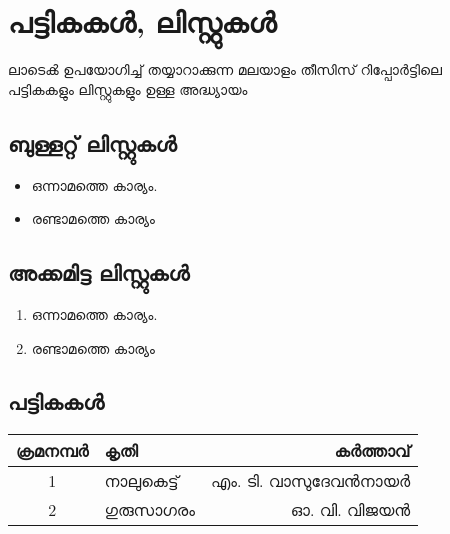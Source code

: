  
\chapter{പട്ടികകൾ, ലിസ്റ്റുകൾ}
ലാടെൿ ഉപയോഗിച്ച് തയ്യാറാക്കുന്ന മലയാളം തീസിസ് റിപ്പോർട്ടിലെ പട്ടികകളും ലിസ്റ്റുകളും ഉള്ള അദ്ധ്യായം

\section{ബുള്ളറ്റ് ലിസ്റ്റുകൾ}

\begin{itemize}
\item ഒന്നാമത്തെ കാര്യം.
\item രണ്ടാമത്തെ കാര്യം
\end{itemize}

\section{അക്കമിട്ട ലിസ്റ്റുകൾ}
\begin{enumerate}
\item ഒന്നാമത്തെ കാര്യം.
\item രണ്ടാമത്തെ കാര്യം
\end{enumerate}


\section{പട്ടികകൾ}

\begin{tabular}{|c|l|r|}
		\hline
		ക്രമനമ്പർ &  കൃതി  & കർത്താവ്  \\ \hline 
		1 & നാലുകെട്ട് & എം. ടി. വാസുദേവൻനായർ \\  \hline
		2 & ഗുരുസാഗരം & ഓ. വി. വിജയൻ \\ \hline
		
\end{tabular}